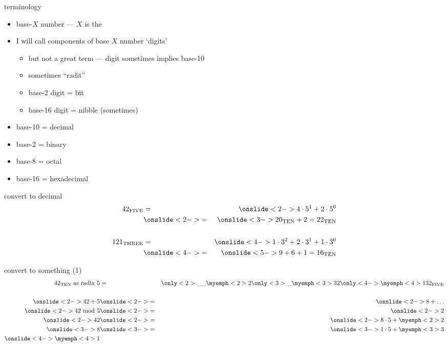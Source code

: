 \begin{frame}{terminology}
    \begin{itemize}
    \item base-$X$ number --- $X$ is the 
    \item I will call components of base $X$ number `digits'
        \begin{itemize}
        \item but not a great term --- digit sometimes implies base-10
        \item sometimes ``radit''
        \item base-2 digit = bit
        \item base-16 digit = nibble (sometimes)
        \end{itemize}
    \item base-10 = decimal
    \item base-2 = binary
    \item base-8 = octal
    \item base-16 = hexadecimal
    \end{itemize}
\end{frame}

\begin{frame}{convert to decimal}
\begin{eqnarray*}
    42_\text{FIVE} & = & \onslide<2->{4 \cdot 5^1 + 2 \cdot 5^0} \\
                   & \onslide<2->{=} & \onslide<3->{20_\text{TEN} + 2 = 22_\text{TEN}} \\
                   ~\\
    121_\text{THREE} & = & \onslide<4->{1\cdot 3^2 + 2 \cdot 3^1 + 1 \cdot 3^0} \\
                     & \onslide<4->{=} & \onslide<5->{9 + 6 + 1 = 16_\text{TEN}} \\
\end{eqnarray*}
\end{frame}

\begin{frame}{convert to something (1)}
\begin{eqnarray*}
    42_\text{TEN} \text{~as radix 5} &=& \only<2>{\_\_\myemph<2>{2}}\only<3>{\_\myemph<3>{3}2}\only<4->{\myemph<4>{1}32_\text{FIVE}} \\
    ~ \\
    \onslide<2->{42 \div 5} & \onslide<2->{=} & \onslide<2->{8 + \ldots} \\
    \onslide<2->{42 \text{~mod~} 5} & \onslide<2->{=} & \onslide<2->{2} \\
    \onslide<2->{42} & \onslide<2->{=} & \onslide<2->{8 \cdot 5 + \myemph<2>{2}} \\
    \onslide<3->{8} & \onslide<3->{=} & \onslide<3->{1 \cdot 5 + \myemph<3>{3}} \\
    \onslide<4->{\myemph<4>{1}}
\end{eqnarray*}
\end{frame}


